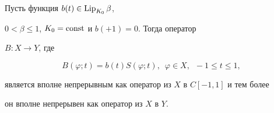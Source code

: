 \begin{lem}


Пусть функция $b(t)\in \operatorname{Lip}_{K_0}\beta$,


$0<\beta\leq 1$, $K_0=\operatorname{const}$ и $b(+1)=0$. Тогда оператор 


$B:X\to Y$, где


$$


B(\varphi;t)=b(t)S(\varphi;t),\ \;\varphi\in X,\ \; -1\leq t\leq 1,


$$


является вполне непрерывным как оператор из $X$ в $C[-1,1]$ и тем более


он вполне непрерывен как оператор из $X$ в $Y$.


\end{lem}





